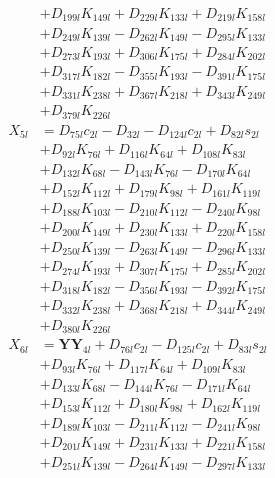 \begin{multicols}{2}
\begin{align}
&+ D_{199l}K_{149l} + D_{229l}K_{133l} + D_{219l}K_{158l}  \nonumber \\
&+ D_{249l}K_{139l} - D_{262l}K_{149l} - D_{295l}K_{133l}  \nonumber \\
&+ D_{273l}K_{193l} + D_{306l}K_{175l} + D_{284l}K_{202l}  \nonumber \\
&+ D_{317l}K_{182l} - D_{355l}K_{193l} - D_{391l}K_{175l}  \nonumber \\
&+ D_{331l}K_{238l} + D_{367l}K_{218l} + D_{343l}K_{249l}  \nonumber \\
&+ D_{379l}K_{226l} \nonumber \\
X_{5l} &= D_{75l}c_{2l} - D_{32l} - D_{124l}c_{2l} + D_{82l}s_{2l}  \nonumber \\
&+ D_{92l}K_{76l} + D_{116l}K_{64l} + D_{108l}K_{83l}  \nonumber \\
&+ D_{132l}K_{68l} - D_{143l}K_{76l} - D_{170l}K_{64l}  \nonumber \\
&+ D_{152l}K_{112l} + D_{179l}K_{98l} + D_{161l}K_{119l}  \nonumber \\
&+ D_{188l}K_{103l} - D_{210l}K_{112l} - D_{240l}K_{98l}  \nonumber \\
&+ D_{200l}K_{149l} + D_{230l}K_{133l} + D_{220l}K_{158l}  \nonumber \\
&+ D_{250l}K_{139l} - D_{263l}K_{149l} - D_{296l}K_{133l}  \nonumber \\
&+ D_{274l}K_{193l} + D_{307l}K_{175l} + D_{285l}K_{202l}  \nonumber \\
&+ D_{318l}K_{182l} - D_{356l}K_{193l} - D_{392l}K_{175l}  \nonumber \\
&+ D_{332l}K_{238l} + D_{368l}K_{218l} + D_{344l}K_{249l}  \nonumber \\
&+ D_{380l}K_{226l} \nonumber \\
X_{6l} &= \mathbf{YY}_{4l} + D_{76l}c_{2l} - D_{125l}c_{2l} + D_{83l}s_{2l}  \nonumber \\
&+ D_{93l}K_{76l} + D_{117l}K_{64l} + D_{109l}K_{83l}  \nonumber \\
&+ D_{133l}K_{68l} - D_{144l}K_{76l} - D_{171l}K_{64l}  \nonumber \\
&+ D_{153l}K_{112l} + D_{180l}K_{98l} + D_{162l}K_{119l}  \nonumber \\
&+ D_{189l}K_{103l} - D_{211l}K_{112l} - D_{241l}K_{98l}  \nonumber \\
&+ D_{201l}K_{149l} + D_{231l}K_{133l} + D_{221l}K_{158l}  \nonumber \\
&+ D_{251l}K_{139l} - D_{264l}K_{149l} - D_{297l}K_{133l}  \nonumber \\

\end{align}
\end{multicols}
